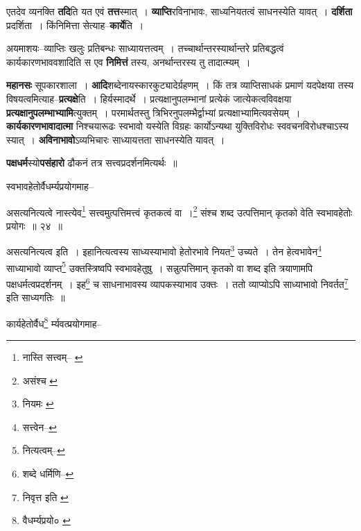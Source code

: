 \documentclass[article,12pt,a4paper]{memoir}
\begin{document}
	  \pstart एतदेव व्यनक्ति \textbf{तदि}ति यत एवं \textbf{तत्त}स्मात् । \textbf{व्याप्ति}रविनाभावः, साध्यनियतत्वं साधनस्येति यावत् । \textbf{दर्शिता} प्रदर्शिता । किंनिमित्ता सेत्याह--\textbf{कार्ये}ति ।
	\pend
      

	  \pstart अयमाशयः--व्याप्तिः खलुः प्रतिबन्धः साध्यायत्तत्वम् । तच्चार्थान्तरस्यार्थान्तरे प्रतिबद्धत्वं कार्यकारणभाववशादिति स एव \textbf{निमित्तं} तस्य, अनर्थान्तरस्य तु तादा\leavevmode{}त्म्यम् ।
	\pend
      

	  \pstart \textbf{महानसः} सूपकारशाला । \textbf{आदि}शब्देनायस्कारकुट्यादेर्ग्रहणम् । किं तत्र व्याप्तिसाधकं प्रमाणं यदपेक्षया तस्य विषयत्वमित्याह--\textbf{प्रत्यक्षे}ति । हिर्यस्मादर्थे । प्रत्यक्षानुपलम्भानां प्रत्येकं जात्येकत्वविवक्षया \textbf{प्रत्यक्षानुपलम्भाभ्यामि}त्युक्तम् । परमार्थतस्तु त्रिभिरनुपलम्भैर्द्वाभ्यां प्रत्यक्षाभ्यामित्यवसेयम् । \textbf{कार्यकारणभावादात्मा} निश्चयारूढः स्वभावो यस्येति विग्रहः कार्योऽन्यथा युक्तिविरोधः स्ववचनविरोधश्चाऽस्य स्यात् । \textbf{अविनाभावो}ऽव्यभिचारः साध्यायत्तता साधनस्येति यावत् ।
	\pend
      

	  \pstart \textbf{पक्षधर्म}स्यो\textbf{पसंहारो} ढौकनं तत्र सत्त्वप्रदर्शनमित्यर्थः ॥
	\pend
      \leavevmode{}
	  \bigskip
	  \begingroup
	

	  \pstart स्वभावहेतोर्वैधर्म्यप्रयोगमाह--
	\pend
       
	  \bigskip
	  \begingroup
	

	  \pstart असत्यनित्यत्वे नास्त्येव\footnote{नास्ति सत्त्वम्--\cite{dp-msB} \cite{dp-msD} \cite{dp-edP} \cite{dp-edH} \cite{dp-edE} \cite{dp-edN}} सत्त्वमुत्पत्तिमत्त्वं कृतकत्वं वा ।\footnote{असंश्च \cite{dp-msB} \cite{dp-edP} \cite{dp-edH} \cite{dp-edN}} संश्च शब्द उत्पत्तिमान् कृतको वेति स्वभावहेतोः प्रयोगः ॥ २४ ॥
	\pend
      
	  \endgroup
	 

	  \pstart असत्यनित्यत्व इति । इहानित्यत्वस्य साध्यस्याभावो हेतोरभावे नियत\footnote{नियमः \cite{dp-msB}} उच्यते । तेन हेत्वभावेन\footnote{सत्त्वेन--\cite{dp-msD-n}} साध्याभावो व्याप्त\footnote{नित्यत्वम्--\cite{dp-msD-n}} उक्तस्त्रिष्वपि स्वभावहेतुषु । सन्नुत्पत्तिमान् कृतको वा शब्द इति त्रयाणामपि पक्षधर्मत्वप्रदर्शनम् । इह\footnote{शब्दे धर्मिणि--\cite{dp-msD-n}} च साधनाभावस्य व्यापकस्याभाव उक्तः । ततो व्याप्योऽपि साध्याभावो निवर्तत\footnote{निवृत्त इति \cite{dp-msA} \cite{dp-edP} \cite{dp-edH} \cite{dp-edE} \cite{dp-edN}} इति साध्यगतिः ॥
	\pend
       

	  \pstart कार्यहेतोर्वैध\footnote{वैधर्म्यप्रयो० \cite{dp-msA} \cite{dp-edP} \cite{dp-edH} \cite{dp-edE} \cite{dp-edN}} र्म्यवत्प्रयोगमाह--
	\pend
       
\end{document}
